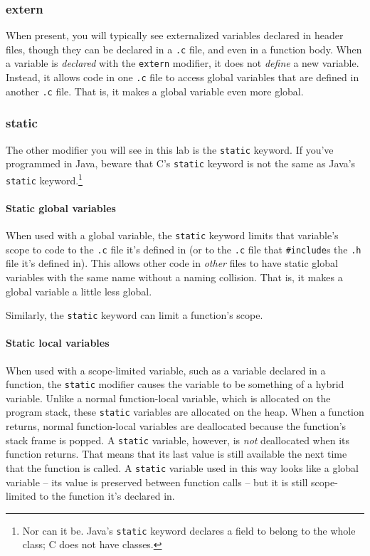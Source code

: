 \subsubsection{extern}

When present, you will typically see externalized variables declared in header files, though they can be declared in a \texttt{.c} file, and even in a function body.
When a variable is \textit{declared} with the \lstinline{extern} modifier, it does not \textit{define} a new variable.
Instead, it allows code in one \texttt{.c} file to access global variables that are defined in another \texttt{.c} file.
That is, it makes a global variable even more global.

\subsubsection{static}

The other modifier you will see in this lab is the \lstinline{static} keyword.
If you've programmed in Java, beware that C's \lstinline{static} keyword is not the same as Java's \lstinline{static} keyword.\footnote{
    Nor can it be.
    Java's \lstinline{static} keyword declares a field to belong to the whole class;
    C does not have classes.
}

\paragraph{Static global variables}

When used with a global variable, the \lstinline{static} keyword limits that variable's scope to code to the \texttt{.c} file it's defined in (or to the \texttt{.c} file that \lstinline{#include}s the \texttt{.h} file it's defined in).
This allows other code in \textit{other} files to have static global variables with the same name without a naming collision.
That is, it makes a global variable a little less global.

Similarly, the \lstinline{static} keyword can limit a function's scope.

\paragraph{Static local variables}

When used with a scope-limited variable, such as a variable declared in a function, the \lstinline{static} modifier causes the variable to be something of a hybrid variable.
Unlike a normal function-local variable, which is allocated on the program stack, these \lstinline{static} variables are allocated on the heap.
When a function returns, normal function-local variables are deallocated because the function's stack frame is popped.
A \lstinline{static} variable, however, is \textit{not} deallocated when its function returns.
That means that its last value is still available the next time that the function is called.
A \lstinline{static} variable used in this way looks like a global variable -- its value is preserved between function calls -- but it is still scope-limited to the function it's declared in.

